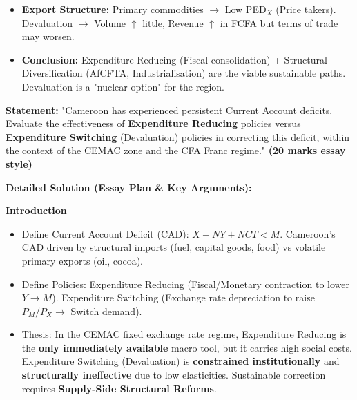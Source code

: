 \documentclass[11pt]{article}
\begin{document}
\begin{methode}
\begin{enumerate}
\begin{itemize}
            \item \textbf{Export Structure:} Primary commodities $\rightarrow$ Low PED$_X$ (Price takers). Devaluation $\rightarrow$ Volume $\uparrow$ little, Revenue $\uparrow$ in FCFA but terms of trade may worsen.
            \item \textbf{Conclusion:} Expenditure Reducing (Fiscal consolidation) + Structural Diversification (AfCFTA, Industrialisation) are the viable sustainable paths. Devaluation is a "nuclear option" for the region.
        \end{itemize}
\end{enumerate}
\end{methode}

\begin{exoresolu}
\textbf{Statement:} "Cameroon has experienced persistent Current Account deficits. Evaluate the effectiveness of \textbf{Expenditure Reducing} policies versus \textbf{Expenditure Switching} (Devaluation) policies in correcting this deficit, within the context of the CEMAC zone and the CFA Franc regime." \textbf{(20 marks essay style)}

\tcblower
\textbf{Detailed Solution (Essay Plan \& Key Arguments):}

\textbf{Introduction}
\begin{itemize}
    \item Define Current Account Deficit (CAD): $X + NY + NCT < M$. Cameroon's CAD driven by structural imports (fuel, capital goods, food) vs volatile primary exports (oil, cocoa).
    \item Define Policies: Expenditure Reducing (Fiscal/Monetary contraction to lower $Y \rightarrow M$). Expenditure Switching (Exchange rate depreciation to raise $P_M/P_X \rightarrow$ Switch demand).
    \item Thesis: In the CEMAC fixed exchange rate regime, Expenditure Reducing is the \textbf{only immediately available} macro tool, but it carries high social costs. Expenditure Switching (Devaluation) is \textbf{constrained institutionally} and \textbf{structurally ineffective} due to low elasticities. Sustainable correction requires \textbf{Supply-Side Structural Reforms}.
\end{itemize}


\end{exoresolu}
\end{document}

